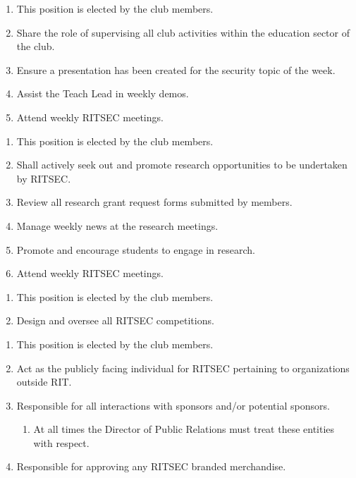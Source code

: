 
\begin{enumerate}
  \item This position is elected by the club members.
  \item Share the role of supervising all club activities within the education
    sector of the club.
  \item Ensure a presentation has been created for the security topic of the
    week.
  \item Assist the Teach Lead in weekly demos.
  \item Attend weekly RITSEC meetings.
\end{enumerate}


\begin{enumerate}
  \item This position is elected by the club members.
  \item Shall actively seek out and promote research opportunities to be
    undertaken by RITSEC.
  \item Review all research grant request forms submitted by members. 
  \item Manage weekly news at the research meetings.
  \item Promote and encourage students to engage in research.
  \item Attend weekly RITSEC meetings.
\end{enumerate}


\begin{enumerate}
  \item This position is elected by the club members.
  \item Design and oversee all RITSEC competitions.
\end{enumerate}


\begin{enumerate}
  \item This position is elected by the club members.
  \item Act as the publicly facing individual for RITSEC pertaining to
    organizations outside RIT.
  \item Responsible for all interactions with sponsors and/or potential sponsors.
  \begin{enumerate}
    \item At all times the Director of Public Relations must treat these
      entities with respect.
  \end{enumerate}
  \item Responsible for approving any RITSEC branded merchandise.
\end{enumerate}

